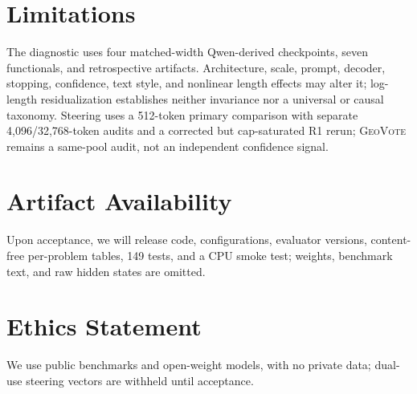 \section*{Limitations}

The diagnostic uses four matched-width Qwen-derived checkpoints, seven
functionals, and retrospective artifacts. Architecture, scale,
prompt, decoder, stopping, confidence, text style, and nonlinear length effects
may alter it; log-length residualization establishes neither invariance nor a
universal or causal taxonomy. Steering uses a 512-token primary comparison with
separate 4,096/32,768-token audits and a corrected but cap-saturated R1 rerun;
\textsc{GeoVote} remains a same-pool audit, not an independent confidence
signal.

\section*{Artifact Availability}

Upon acceptance, we will release code, configurations, evaluator versions,
content-free per-problem tables, 149 tests, and a CPU smoke test; weights,
benchmark text, and raw hidden states are omitted.

\section*{Ethics Statement}

We use public benchmarks and open-weight models, with no private data;
dual-use steering vectors are withheld until acceptance.
